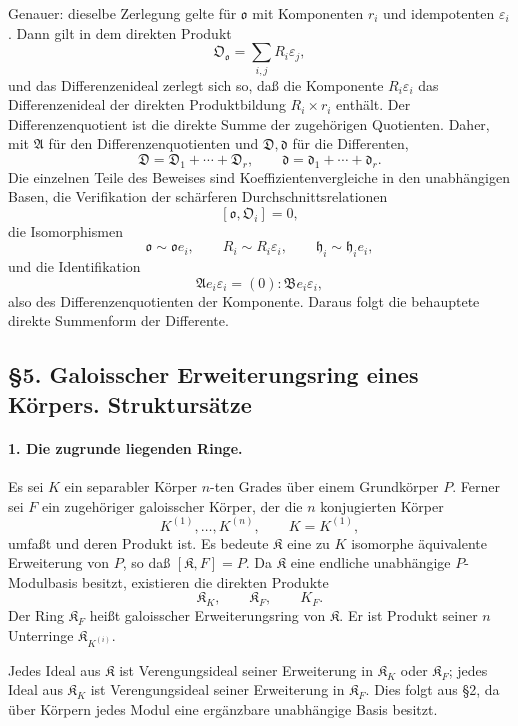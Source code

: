 \documentclass[11pt]{article}
\begin{document}
Genauer: dieselbe Zerlegung gelte für $\mathfrak o$ mit Komponenten $r_i$ und idempotenten $\varepsilon_i$. Dann gilt in dem direkten Produkt
\[
        \mathfrak O_{\mathfrak o}=\sum_{i,j} R_i\varepsilon_j,
\]
und das Differenzenideal zerlegt sich so, daß die Komponente $R_i\varepsilon_i$ das Differenzenideal der direkten Produktbildung $R_i\times r_i$ enthält. Der Differenzenquotient ist die direkte Summe der zugehörigen Quotienten. Daher, mit $\mathfrak A$ für den Differenzenquotienten und $\mathfrak D,\mathfrak d$ für die Differenten,
\[
        \mathfrak D=\mathfrak D_1+\cdots+\mathfrak D_r,
        \qquad
        \mathfrak d=\mathfrak d_1+
        \cdots+\mathfrak d_r.
\]
Die einzelnen Teile des Beweises sind Koeffizientenvergleiche in den unabhängigen Basen, die Verifikation der schärferen Durchschnittsrelationen
\[
        [\mathfrak o,\mathfrak O_i]=0,
\]
die Isomorphismen
\[
        \mathfrak o\sim\mathfrak o e_i,
        \qquad
        R_i\sim R_i\varepsilon_i,
        \qquad
        \mathfrak h_i\sim \mathfrak h_i e_i,
\]
und die Identifikation
\[
        \mathfrak A e_i\varepsilon_i=(0):\mathfrak B e_i\varepsilon_i,
\]
also des Differenzenquotienten der Komponente. Daraus folgt die behauptete direkte Summenform der Differente.

\subsection*{§5. Galoisscher Erweiterungsring eines Körpers. Struktursätze}

\paragraph{1. Die zugrunde liegenden Ringe.}
Es sei $K$ ein separabler Körper $n$-ten Grades über einem Grundkörper $P$. Ferner sei $F$ ein zugehöriger galoisscher Körper, der die $n$ konjugierten Körper
\[
        K^{(1)},\ldots,K^{(n)},\qquad K=K^{(1)},
\]
umfaßt und deren Produkt ist. Es bedeute $\mathfrak K$ eine zu $K$ isomorphe äquivalente Erweiterung von $P$, so daß $[\mathfrak K,F]=P$. Da $\mathfrak K$ eine endliche unabhängige $P$-Modulbasis besitzt, existieren die direkten Produkte
\[
        \mathfrak K_K,
        \qquad \mathfrak K_F,
        \qquad K_F.
\]
Der Ring $\mathfrak K_F$ heißt galoisscher Erweiterungsring von $\mathfrak K$. Er ist Produkt seiner $n$ Unterringe $\mathfrak K_{K^{(i)}}$.

Jedes Ideal aus $\mathfrak K$ ist Verengungsideal seiner Erweiterung in $\mathfrak K_K$ oder $\mathfrak K_F$; jedes Ideal aus $\mathfrak K_K$ ist Verengungsideal seiner Erweiterung in $\mathfrak K_F$. Dies folgt aus §2, da über Körpern jedes Modul eine ergänzbare unabhängige Basis besitzt.
\end{document}
